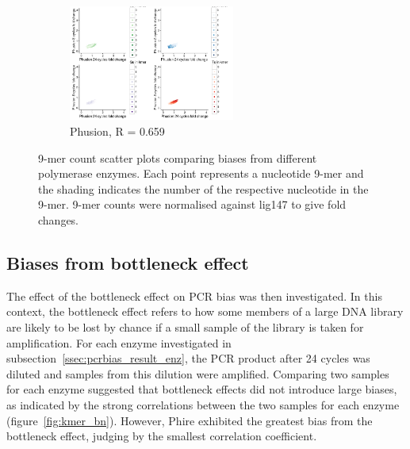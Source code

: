 \documentclass[parskip=full, numbers=noenddot]{scrbook}
\begin{document}
\begin{figure}[htbp]
\begin{subfigure}[htbp]{0.6\textwidth}
    \centering
    \includegraphics[width=0.6\textwidth]{kmer_phusion}
    \caption{Phusion, R = 0.659}
    \label{fig:kmer_enz_phusion}
  \end{subfigure}
  \caption{9-mer count scatter plots comparing biases from different polymerase enzymes.  Each point represents a nucleotide 9-mer and the shading indicates the number of the respective nucleotide in the 9-mer.  9-mer counts were normalised against lig147 to give fold changes.}
  \label{fig:kmer_enz}
\end{figure}

\subsection{Biases from bottleneck effect}
\label{ssec:pcrbias_result_bn}

The effect of the bottleneck effect on PCR bias was then investigated.  In this context, the bottleneck effect refers to how some members of a large DNA library are likely to be lost by chance if a small sample of the library is taken for amplification.  For each enzyme investigated in subsection~\ref{ssec:pcrbias_result_enz}, the PCR product after 24 cycles was diluted and samples from this dilution were amplified.  Comparing two samples for each enzyme suggested that bottleneck effects did not introduce large biases, as indicated by the strong correlations between the two samples for each enzyme (figure~\ref{fig:kmer_bn}).  However, Phire exhibited the greatest bias from the bottleneck effect, judging by the smallest correlation coefficient.
\end{document}
